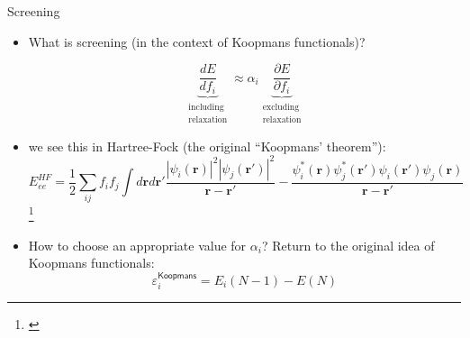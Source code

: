 \documentclass[xcolor=table,aspectratio=169]{beamer}
\newcommand\blfootcite[1]{%
  \begingroup
  \renewcommand\thefootnote{}\footnote{\hspace{-4ex}\cite{#1}}%
  \addtocounter{footnote}{-1}%
  \endgroup
}
\numberwithin{equation}{section}
\begin{document}
\begin{frame}{Screening}
   \begin{itemize}[<+->]
      \item What is screening (in the context of Koopmans functionals)?

            \begin{equation*}
               \underbrace{
                  \frac{d E}{d f_i}
               }_{\substack{\text{including} \\ \text{relaxation}}}
               \approx
               \alpha_i
               \underbrace{\frac{\partial E}{\partial f_i}
               }_{\substack{\text{excluding} \\ \text{relaxation}}}
            \end{equation*}
      \item we see this in Hartree-Fock (the original ``Koopmans' theorem''):
            \begin{equation*}
               E^{HF}_{ee} = \frac{1}{2}\sum_{ij} f_i f_j \int d\mathbf{r} d\mathbf{r}' \frac{|\psi_i(\mathbf{r})|^2|\psi_j(\mathbf{r'})|^2}{\mathbf{r} - \mathbf{r}'} - \frac{\psi_i^*(\mathbf{r})\psi_j^*(\mathbf{r'})\psi_i(\mathbf{r'})\psi_j(\mathbf{r})}{\mathbf{r} - \mathbf{r}'}
            \end{equation*}
            \blfootcite{Li2017}
      \item How to choose an appropriate value for $\alpha_i$? Return to the original idea of Koopmans functionals:
            \begin{equation*}
               \varepsilon_i^\mathsf{Koopmans} = E_i(N-1) - E(N)
            \end{equation*}
   \end{itemize}

\end{frame}
\end{document}
